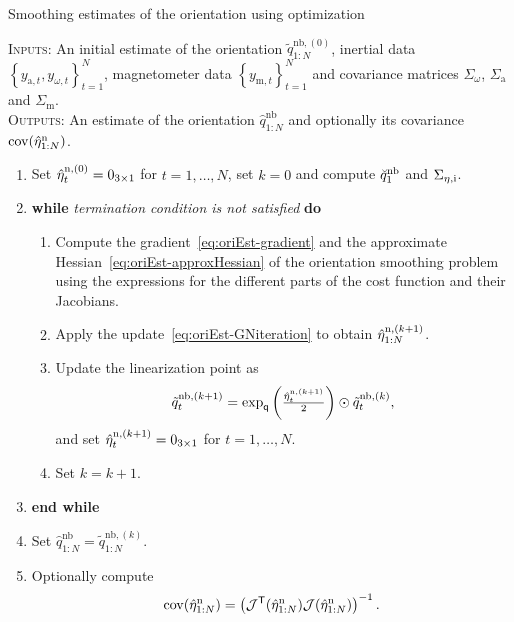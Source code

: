 \documentclass{article}
\begin{document}
\begin{algorithm}[ht]
  \caption{\textsf{Smoothing estimates of the orientation using optimization}}
  \label{alg:oriEst-smoothingOpt}
  \small
  \textsc{Inputs:} An initial estimate of the orientation $\tilde{q}^{\text{nb},(0)}_{1:N}$, inertial data $\left\{ y_{\text{a},t}, y_{\omega,t} \right\}_{t=1}^N$, magnetometer data $\left\{ y_{\text{m},t}\right\}_{t=1}^N$ and covariance matrices $\Sigma_\omega$, $\Sigma_\text{a}$ and $\Sigma_\text{m}$. \\
  \textsc{Outputs:} An estimate of the orientation $\hat{q}^\text{nb}_{1:N}$ and optionally its covariance $\operatorname{cov} (\hat{\eta}^\text{n}_{1:N})$.
  \algrule[.4pt]
  \begin{enumerate}
  \item Set $\hat {\eta}_t^{\text{n},(0)} = 0_{3 \times 1}$ for $t = 1, \hdots, N$, set $k = 0$ and compute $\breve{q}_1^\text{nb}$ and $\Sigma_{\eta,\text{i}}$.
  \item \textbf{while} \textit{termination condition is not satisfied} \textbf{do}
  \begin{enumerate}
  \item Compute the gradient~\eqref{eq:oriEst-gradient} and the approximate Hessian~\eqref{eq:oriEst-approxHessian} of the orientation smoothing problem using the expressions for the different parts of the cost function and their Jacobians.
  \item Apply the update~\eqref{eq:oriEst-GNiteration} to obtain $\hat {\eta}_{1:N}^{\text{n},(k+1)}$.
  \item Update the linearization point as
  \begin{align}
  \tilde q^{\text{nb},(k+1)}_t = \exp_\mathsf{q} \left( \tfrac{\hat{\eta}_t^{\text{n},(k+1)}}{2} \right) \odot \tilde{q}^{\text{nb},(k)}_t,
  \label{eq:oriEst-relinSmoothing}
  \end{align}
  and set $\hat {\eta}_t^{\text{n},(k+1)} = 0_{3 \times 1}$ for $t = 1, \hdots, N$.
  \item Set $k = k+1$.
  \end{enumerate}
  \item[] \textbf{end while}
  \item Set $\hat{q}^\text{nb}_{1:N} = \tilde{q}^{\text{nb},(k)}_{1:N}$.
  \item Optionally compute
  \begin{align}
  \operatorname{cov} (\hat{\eta}^\text{n}_{1:N}) = \left( \mathcal{J}^{\mathsf{T}}(\hat{\eta}^\text{n}_{1:N}) \mathcal{J} (\hat{\eta}^\text{n}_{1:N}) \right)^{-1}.
  \end{align}
  \end{enumerate}
  \normalsize
\end{algorithm}
\end{document}
